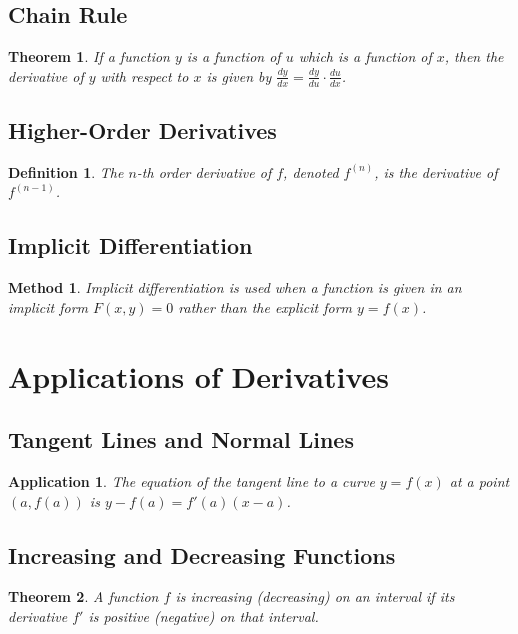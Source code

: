 \documentclass[a4paper,12pt]{book}
\newtheorem{theorem}{Theorem}
\newtheorem{application}{Application}
\newtheorem{definition}{Definition}
\newtheorem{method}{Method}
\begin{document}
\subsection{Chain Rule}
\begin{theorem}
If a function \( y \) is a function of \( u \) which is a function of \( x \), then the derivative of \( y \) with respect to \( x \) is given by \( \frac{dy}{dx} = \frac{dy}{du} \cdot \frac{du}{dx} \).
\end{theorem}

\subsection{Higher-Order Derivatives}
\begin{definition}
The \( n \)-th order derivative of \( f \), denoted \( f^{(n)} \), is the derivative of \( f^{(n-1)} \).
\end{definition}

\subsection{Implicit Differentiation}
\begin{method}
Implicit differentiation is used when a function is given in an implicit form \( F(x, y) = 0 \) rather than the explicit form \( y = f(x) \).
\end{method}

\section{Applications of Derivatives}
\subsection{Tangent Lines and Normal Lines}
\begin{application}
The equation of the tangent line to a curve \( y = f(x) \) at a point \( (a, f(a)) \) is \( y - f(a) = f'(a)(x - a) \).
\end{application}

\subsection{Increasing and Decreasing Functions}
\begin{theorem}
A function \( f \) is increasing (decreasing) on an interval if its derivative \( f' \) is positive (negative) on that interval.
\end{theorem}
\end{document}
